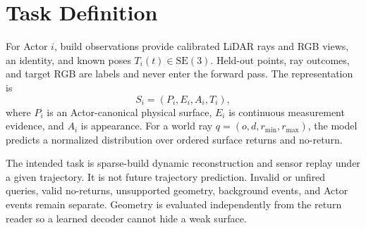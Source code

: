 \section{Task Definition}
For Actor $i$, build observations provide calibrated LiDAR rays and RGB views, an
identity, and known poses $T_i(t)\in\mathrm{SE}(3)$. Held-out points, ray outcomes, and
target RGB are labels and never enter the forward pass. The representation is
\[
S_i=(P_i,E_i,A_i,T_i),
\]
where $P_i$ is an Actor-canonical physical surface, $E_i$ is continuous measurement
evidence, and $A_i$ is appearance. For a world ray $q=(o,d,r_{\min},r_{\max})$, the
model predicts a normalized distribution over ordered surface returns and no-return.

The intended task is sparse-build dynamic reconstruction and sensor replay under a
given trajectory. It is not future trajectory prediction. Invalid or unfired queries,
valid no-returns, unsupported geometry, background events, and Actor events remain
separate. Geometry is evaluated independently from the return reader so a learned
decoder cannot hide a weak surface.
